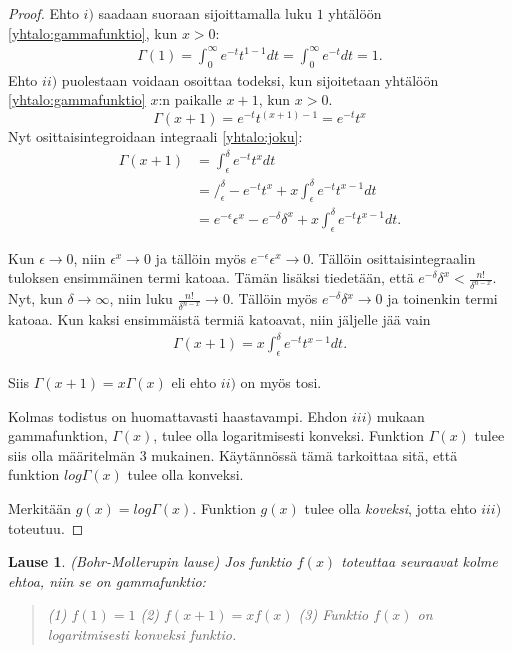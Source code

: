 \documentclass[12pt]{article}
\theoremstyle{definition}
\theoremstyle{plain}
\newtheorem{lause}[maar]{Lause}
\begin{document}
\begin{proof}
Ehto $i)$ saadaan suoraan sijoittamalla luku $1$ yhtälöön \eqref{yhtalo:gammafunktio}, kun $x>0$:
\begin{align*}
    \Gamma(1) = \int_0^\infty e^{-t}t^{1-1} dt = \int_0^\infty e^{-t}dt = 1.
\end{align*}
Ehto $ii)$ puolestaan voidaan osoittaa todeksi, kun sijoitetaan yhtälöön \eqref{yhtalo:gammafunktio} $x$:n paikalle $x+1$, kun $x>0$.
\begin{equation}\label{yhtalo:joku}
    \Gamma(x+1)=e^{-t}t^{(x+1)-1} = e^{-t}t^{x}
\end{equation}
Nyt osittaisintegroidaan integraali \eqref{yhtalo:joku}:
\begin{align*}
    \Gamma(x+1) & = \int_{\epsilon}^{\delta} e^{-t} t^{x} dt \\
    & = \Big/_\epsilon^\delta -e^{-t}t^{x}+x\int_\epsilon^\delta e^{-t}t^{x-1}dt \\
    & = e^{-\epsilon}\epsilon^{x}-e^{-\delta}\delta^{x}+x\int_\epsilon^\delta e^{-t}t^{x-1}dt.
\end{align*}

Kun $\epsilon\rightarrow0$, niin $\epsilon^x\rightarrow0$ ja tällöin myös $e^{-\epsilon}\epsilon^x \rightarrow0$. Tällöin osittaisintegraalin tuloksen ensimmäinen termi katoaa. Tämän lisäksi tiedetään, että $e^{-\delta}\delta^{x} < \frac{n!}{\delta^{n-x}}$. Nyt, kun $\delta\rightarrow\infty$, niin luku $\frac{n!}{\delta^{n-x}}\rightarrow0.$ Tällöin myös $e^{-\delta}\delta{^x}\rightarrow0$ ja toinenkin termi katoaa. Kun kaksi ensimmäistä termiä katoavat, niin jäljelle jää vain 
\begin{align*}
   \Gamma(x+1)=x\int_\epsilon^\delta e^{-t}t^{x-1}dt.
\end{align*}

Siis $\Gamma(x+1) = x\Gamma(x)$ eli ehto $ii)$ on myös tosi.\newline

Kolmas todistus on huomattavasti haastavampi. Ehdon $iii)$ mukaan gammafunktion, $\Gamma(x)$, tulee olla logaritmisesti konveksi. Funktion $\Gamma(x)$ tulee siis olla määritelmän 3 mukainen. Käytännössä tämä tarkoittaa sitä, että funktion $log\Gamma(x)$ tulee olla konveksi.\newline

Merkitään $g(x) = log\Gamma(x)$. Funktion $g(x)$ tulee olla \emph{koveksi}, jotta ehto $iii)$ toteutuu.
\end{proof}

\begin{lause}
(Bohr-Mollerupin lause)
\newline
Jos funktio $f(x)$ toteuttaa seuraavat kolme ehtoa, niin se on gammafunktio:
\begin{quote}
(1) $f(1)=1$ \newline
(2) $f(x+1)=xf(x)$ \newline
(3) Funktio $f(x)$ on logaritmisesti konveksi funktio.
\end{quote}
\end{lause}
\end{document}
